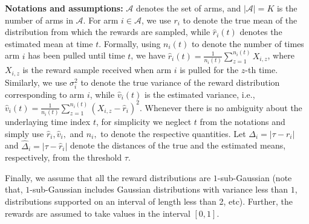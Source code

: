 \textbf{Notations and assumptions:} $\mathcal{A}$ denotes the set of arms, and $|\mathcal{A}|=K$ is the number of arms in $\mathcal{A}$. 
For arm $i\in\mathcal{A}$, we use $r_{i}$ to denote the true mean of the distribution from which the rewards are sampled, while $\hat{r}_{i}(t)$ denotes the estimated mean at time $t$. Formally, using $n_i(t)$ to denote the number of times arm $i$ has been pulled until time $t$, we have $\hat{r}_{i}(t)=\frac{1}{n_{i}(t)}\sum_{z=1}^{n_i(t)} X_{i,z}$, where $X_{i,z}$ is the reward sample received when arm $i$ is pulled for the $z$-th time. %
Similarly, we use $\sigma_{i}^{2}$ to denote the true variance of the reward distribution corresponding to arm $i$, while $\hat{v}_{i}(t)$ is the estimated variance, i.e., $\hat{v}_{i}(t)=\frac{1}{n_i(t)}\sum_{z=1}^{n_{i}(t)}(X_{i,z}-\hat{r}_{i})^{2}$. Whenever there is no ambiguity about the underlaying  time index $t$, for simplicity we neglect $t$ from the notations and simply use  $\hat{r}_i, \hat{v}_i,$ and $n_i, $ to denote the respective quantities.  Let  $\Delta_{i}=|\tau-r_{i}|$ and $\hat{\Delta}_{i}=|\tau-\hat{r}_{i}|$ denote the distances of the true and the estimated means, respectively, from the threshold $\tau$.




 
Finally, we assume that all the reward distributions 
are $1$-sub-Gaussian (note that,  $1$-sub-Gaussian includes Gaussian distributions with variance less than $1$, distributions supported on an interval of length less than 2, etc). Further, the rewards are assumed to take values in the interval $[0,1]$.

